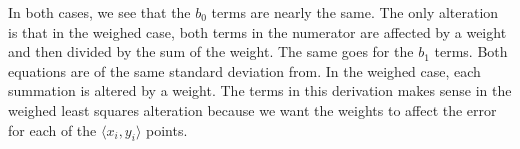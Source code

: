 \documentclass[12pt]{article}
\begin{document}
\begin{enumerate}
In both cases, we see that the $b_0$ terms are nearly the same. The only alteration is that in the weighed case, both terms in the numerator are affected by a weight and then divided by the sum of the weight. The same goes for the $b_1$ terms. Both equations are of the same standard deviation from. In the weighed case, each summation is altered by a weight. The terms in this derivation makes sense in the weighed least squares alteration because we want the weights to affect the error for each of the $\langle x_i, y_i \rangle$ points. 

\end{enumerate}
\end{document}
